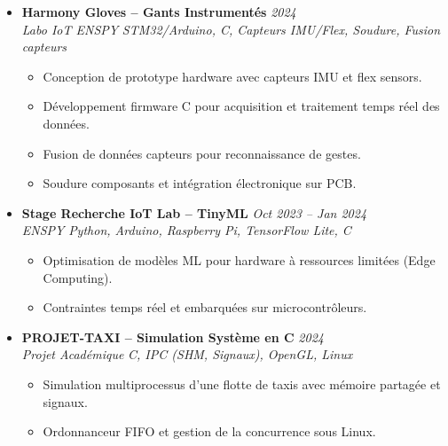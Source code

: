\documentclass[a4paper,11pt]{article}
\begin{document}
\begin{itemize}[leftmargin=*, label={-}]
\item \textbf{Harmony Gloves -- Gants Instrumentés} \hfill \textit{2024} \\
\textit{Labo IoT ENSPY} \hfill \textit{STM32/Arduino, C, Capteurs IMU/Flex, Soudure, Fusion capteurs}
\vspace{-2pt}
    \begin{itemize}[leftmargin=0.4cm, nosep, label=\tiny$\bullet$]
        \item \small{Conception de prototype hardware avec capteurs IMU et flex sensors.}
        \item \small{Développement firmware C pour acquisition et traitement temps réel des données.}
        \item \small{Fusion de données capteurs pour reconnaissance de gestes.}
        \item \small{Soudure composants et intégration électronique sur PCB.}
    \end{itemize}
\vspace{3pt}

\item \textbf{Stage Recherche IoT Lab -- TinyML} \hfill \textit{Oct 2023 -- Jan 2024} \\
\textit{ENSPY} \hfill \textit{Python, Arduino, Raspberry Pi, TensorFlow Lite, C}
\vspace{-2pt}
    \begin{itemize}[leftmargin=0.4cm, nosep, label=\tiny$\bullet$]
        \item \small{Optimisation de modèles ML pour hardware à ressources limitées (Edge Computing).}
        \item \small{Contraintes temps réel et embarquées sur microcontrôleurs.}
    \end{itemize}
\vspace{3pt}

\item \textbf{PROJET-TAXI -- Simulation Système en C} \hfill \textit{2024} \\
\textit{Projet Académique} \hfill \textit{C, IPC (SHM, Signaux), OpenGL, Linux}
\vspace{-2pt}
    \begin{itemize}[leftmargin=0.4cm, nosep, label=\tiny$\bullet$]
        \item \small{Simulation multiprocessus d'une flotte de taxis avec mémoire partagée et signaux.}
        \item \small{Ordonnanceur FIFO et gestion de la concurrence sous Linux.}
    \end{itemize}
\vspace{3pt}


\end{itemize}
\end{document}
